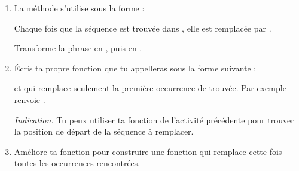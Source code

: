\documentclass[11pt,class=report,crop=false]{standalone}
\begin{document}

\begin{activite}[Remplacer]


\begin{enumerate}
  \item  La méthode  s'utilise sous la forme :

	
	Chaque fois que la séquence  est trouvée dans , elle est remplacée par .
	
	Transforme la phrase  en , puis en 
	.
	
	\item Écris ta propre fonction  que tu appelleras sous la forme suivante :	
  
 et qui remplace seulement la première occurrence de  trouvée. Par exemple  renvoie .
  
  
  \emph{Indication.} Tu peux utiliser ta fonction  de l'activité précédente pour trouver la position de départ de la séquence à remplacer.
  
 	\item Améliore ta fonction pour construire une fonction  qui remplace cette fois toutes les occurrences rencontrées.
 	    
\end{enumerate}    
\end{activite}

\end{document}
